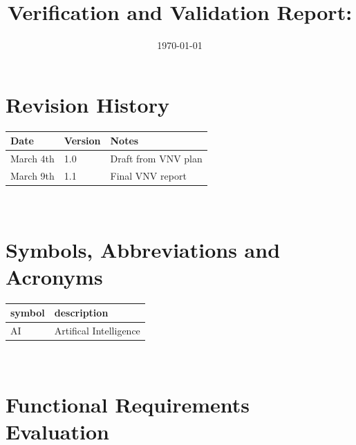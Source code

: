 \documentclass[12pt, titlepage]{article}
\begin{document}
\title{Verification and Validation Report: \progname} 
\author{\authname}
\date{\today}
	
\maketitle


\section{Revision History}

\begin{tabularx}{\textwidth}{p{3cm}p{2cm}X}
\toprule {\bf Date} & {\bf Version} & {\bf Notes}\\
\midrule
March 4th & 1.0 & Draft from VNV plan\\
March 9th & 1.1 & Final VNV report\\
\bottomrule
\end{tabularx}

~\newpage

\section{Symbols, Abbreviations and Acronyms}

\renewcommand{\arraystretch}{1.2}
\begin{tabular}{l l} 
  \toprule		
  \textbf{symbol} & \textbf{description}\\
  \midrule 
  AI & Artifical Intelligence\\
  \bottomrule
\end{tabular}\\

\newpage

\tableofcontents

\listoftables %

\listoffigures %

\newpage


\section{Functional Requirements Evaluation}
\end{document}
